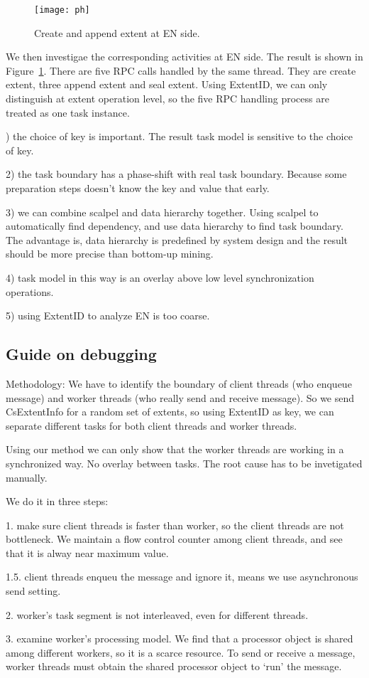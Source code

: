 \begin{figure}
\centering
\texttt{[image: ph]}
\caption{Create and append extent at EN side.}
\label{fig:createextent}
\end{figure}

We then investigae the corresponding activities at EN side.
The result is shown in Figure~\ref{fig:createextent}. There
are five RPC calls handled by the same thread. They are
create extent, three append extent and seal extent. Using
ExtentID, we can only distinguish at extent operation level,
so the five RPC handling process are treated as one task
instance.

) the choice of key is important. The result task model is
sensitive to the choice of key.

2) the task boundary has a phase-shift with real task
boundary. Because some preparation steps doesn't know the
key and value that early.

3) we can combine scalpel and data hierarchy together. Using
scalpel to automatically find dependency, and use data
hierarchy to find task boundary. The advantage is, data
hierarchy is predefined by system design and the result
should be more precise than bottom-up mining.

4) task model in this way is an overlay above low level
synchronization operations.

5) using ExtentID to analyze EN is too coarse.

\subsection{Guide on debugging}

Methodology: We have to identify the boundary of client
threads (who enqueue message) and worker threads (who really
send and receive message). So we send CsExtentInfo for a
random set of extents, so using ExtentID as key, we can
separate different tasks for both client threads and worker
threads.

Using our method we can only show that the worker threads
are working in a synchronized way. No overlay between tasks.
The root cause has to be invetigated manually.

We do it in three steps:

1. make sure client threads is faster than worker, so the
client threads are not bottleneck. We
maintain a flow control counter among client threads, and
see that it is alway near maximum value.

1.5. client threads enqueu the message and ignore it, means
we use asynchronous send setting.

2. worker's task segment is not interleaved, even for
different threads.

3. examine worker's processing model. We find that a
processor object is shared among different workers, so it is
a scarce resource. To send or receive a message, worker
threads must obtain the shared processor object to `run' the
message.

